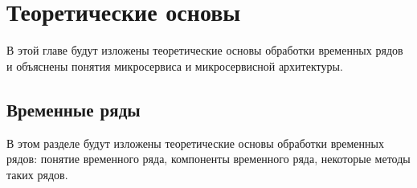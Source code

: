 \chapter{Теоретические основы}
\label{chapter1}

\begin{annotation}
	В этой главе будут изложены теоретические основы обработки временных рядов и объяснены понятия микросервиса и микросервисной архитектуры.   
\end{annotation}

\section{Временные ряды}
\begin{annotation}
	В этом разделе будут изложены теоретические основы обработки временных рядов: понятие временного ряда, компоненты временного ряда, некоторые методы таких рядов. 
\end{annotation}

